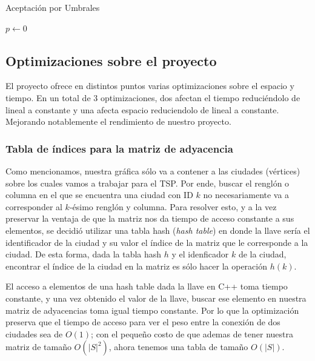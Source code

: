\documentclass{article}
\newcommand{\tit}[1]{\textit{#1}}
\begin{document}
\begin{itemize}
      \begin{algorithm}[H]
        \caption{Aceptación por Umbrales}
        \SetAlgoLined
        $p \leftarrow 0$\;
      \end{algorithm}
  \end{itemize}
  
  \subsection{Optimizaciones sobre el proyecto}

  El proyecto ofrece en distintos puntos varias optimizaciones
  sobre el espacio y tiempo. En un total de 3 optimizaciones, 
  dos afectan el tiempo reduciéndolo de lineal a constante 
  y una afecta espacio reduciendolo de lineal a constante. 
  Mejorando notablemente el rendimiento de nuestro 
  proyecto.
  
  \subsubsection{Tabla de índices para la matriz de adyacencia}
  Como mencionamos, nuestra gráfica sólo va a contener a las 
  ciudades (vértices) sobre los cuales vamos a trabajar para el 
  TSP. Por ende, buscar el renglón o columna en el que se 
  encuentra una ciudad con ID $k$ no necesariamente va a corresponder
  al $k$-ésimo renglón y columna. Para resolver esto, y a la vez 
  preservar la ventaja de que la matriz nos da tiempo de acceso 
  constante a sus elementos, se decidió utilizar una tabla 
  hash (\tit{hash table}) en donde la llave sería el identificador 
  de la ciudad y su valor el índice de la matriz que le corresponde 
  a la ciudad. De esta forma, dada la tabla hash $h$ y el 
  idenficador $k$ de la ciudad, encontrar el índice de la ciudad 
  en la matriz es sólo hacer la operación $h(k)$.

  El acceso a elementos de una hash table dada la llave en C++
  toma tiempo constante, y una vez obtenido el valor de la 
  llave, buscar ese elemento en nuestra matriz de adyacencias 
  toma igual tiempo constante. Por lo que la optimización preserva
  que el tiempo de acceso para ver el peso entre la conexión de 
  dos ciudades sea de $O(1)$; con el pequeño costo de que ademas 
  de tener nuestra matriz de tamaño $O(|S|^2)$, ahora 
  tenemos una tabla de tamaño $O(|S|)$.
  
\end{document}
